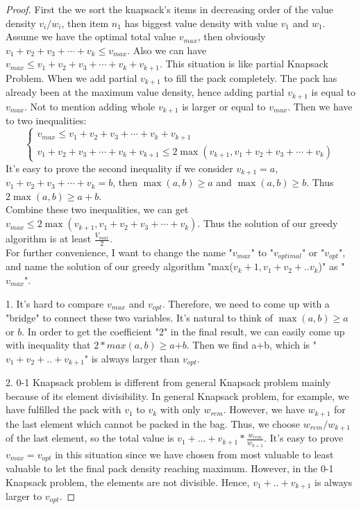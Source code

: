 \documentclass[12pt]{article}
\begin{document}
\begin{proof}
	First the we sort the knapsack's items in decreasing order of the value density $v_i/w_i$, then item $n_1$ has biggest value density with value $v_1$ and $w_1$. Assume we have the optimal total value $v_{max}$, then obviously $v_1+v_2+v_3+\cdots+v_k\le v_{max}$. Also we can have $v_{max}\le v_1+v_2+v_3+\cdots+v_k+v_{k+1}$. This situation is like partial Knapsack Problem. When we add partial $v_{k+1}$ to fill the pack completely. The pack has already been at the maximum value density, hence adding partial $v_{k+1}$ is equal to $v_{max}$. Not to mention adding whole $v_{k+1}$ is larger or equal to $v_{max}$. Then we have to two inequalities:\\
	\begin{equation*}
		\begin{cases}
		v_{max}\le v_1+v_2+v_3+\cdots+v_k+v_{k+1} \\  v_1+v_2+v_3+\cdots+v_k+v_{k+1}\le2\max(v_{k+1},v_1+v_2+v_3+\cdots+v_k)
		\end{cases}
	\end{equation*}
	It's easy to prove the second inequality if we consider $v_{k+1}=a$, $v_1+v_2+v_3+\cdots+v_k=b$, then $\max(a,b)\ge a$ and $\max(a,b)\ge b$. Thus $2\max(a,b)\ge a+b$.\\
	Combine these two inequalities, we can get $v_{max}\le2\max(v_{k+1},v_1+v_2+v_3+\cdots+v_k)$. Thus the solution of our greedy algorithm is at least $\frac{V_{max}}{2}$.\\
	
	For further convenience, I want to change the name "$v_{max}$" to "$v_{optimal}$" or "$v_{opt}$", and name the solution of our greedy algorithm "max($v_k+1,v_1+v_2+..v_k$)" as "$v_{max}$".
	
	1. It's hard to compare $v_{max}$ and $v_{opt}$. Therefore, we need to come up with a "bridge" to connect these two variables. It's natural to think of $\max(a,b) \ge a$ or $b$. In order to get the coefficient "2" in the final result, we can easily come up with inequality that $2*max(a,b) \ge a$+$b$. Then we find a+b, which is "$v_1+v_2+..+v_{k+1}$" is always larger than $v_{opt}$.
	
	2. 0-1 Knapsack problem is different from general Knapsack problem mainly because of its element divisibility. In general Knapsack problem, for example, we have fulfilled the pack with $v_1$ to $v_k$ with only $w_{rem}$. However, we have $w_{k+1}$ for the last element which cannot be packed in the bag.  Thus, we choose $w_{rem}/ w_{k+1}$ of the last element,   so the total value is $v_1+...+v_{k+1}*\frac{w_{rem}}{w_{k+1}}$. It's easy to prove $v_{max} = v_{opt}$ in this situation since we have chosen from most valuable to least valuable to let the final pack density reaching maximum. However, in the 0-1 Knapsack problem, the elements are not divisible. Hence, $v_1+..+v_{k+1}$ is always larger to $v_{opt}$.
\end{proof}
\end{document}
